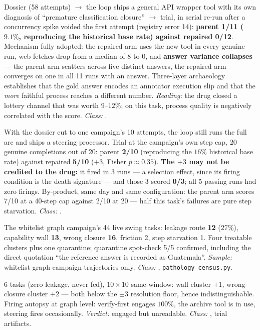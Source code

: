 \begin{description}[leftmargin=0pt,style=nextline,font=\normalfont,itemsep=6pt]
\item[\textbf{F29}\quad Whole-pipeline re-run on a low-base-rate task.]
Dossier (58 attempts) $\to$ the loop ships a general API wrapper tool with
its own diagnosis of ``premature classification closure'' $\to$ trial, in
serial re-run after a concurrency spike voided the first attempt (registry
error 14): \textbf{parent 1/11 ($9.1\%$, reproducing the historical base
rate) against repaired 0/12}. Mechanism fully adopted: the repaired arm
uses the new tool in every genuine run, web fetches drop from a median of 8
to 0, and \textbf{answer variance collapses} --- the parent arm scatters
across five distinct answers, the repaired arm converges on one in all 11
runs with an answer. Three-layer archaeology establishes that the gold
answer encodes an annotator execution slip and that the \emph{more}
faithful process reaches a different number. \emph{Reading:} the drug
closed a lottery channel that was worth $9$--$12\%$; on this task, process
quality is negatively correlated with the score. \emph{Class:} .

\item[\textbf{F30}\quad Single-campaign memory, whole pipeline.]
With the dossier cut to one campaign's 10 attempts, the loop still runs the
full arc and ships a steering processor. Trial at the campaign's own step
cap, 20 genuine completions out of 20: parent \textbf{2/10} (reproducing
the $16\%$ historical base rate) against repaired \textbf{5/10}
($+3$, Fisher $p \approx 0.35$). \textbf{The $+3$ may not be credited to
the drug:} it fired in 3 runs --- a selection effect, since its firing
condition is the death signature --- and those 3 scored \textbf{0/3};
all 5 passing runs had zero firings. By-product, same day and same
configuration: the parent arm scores 7/10 at a 40-step cap against 2/10 at
20 --- half this task's failures are pure step starvation.
\emph{Class:} .

\item[\textbf{F31}\quad Pathology census.]
The whitelist graph campaign's 44 live swing tasks: leakage route
\textbf{12} ($27\%$), capability wall \textbf{13}, wrong closure
\textbf{16}, friction 2, step starvation 1. Four treatable clusters plus
one quarantine; quarantine spot-check 5/5 confirmed, including the direct
quotation ``the reference answer is recorded as Guatemala''.
\emph{Sample:} whitelist graph campaign trajectories only.
\emph{Class:} , \texttt{pathology\_census.py}.

\item[\textbf{F32}\quad Clean-cluster transfer trial.]
6 tasks (zero leakage, never fed), $10 \times 10$ same-window: wall cluster
$+1$, wrong-closure cluster $+2$ --- both below the $\pm 3$ resolution
floor, hence indistinguishable. Firing autopsy at graph level: verify-first
engages $100\%$, the archive tool is in use, steering fires occasionally.
\emph{Verdict:} engaged but unreadable. \emph{Class:} , trial
artifacts.


\end{description}
